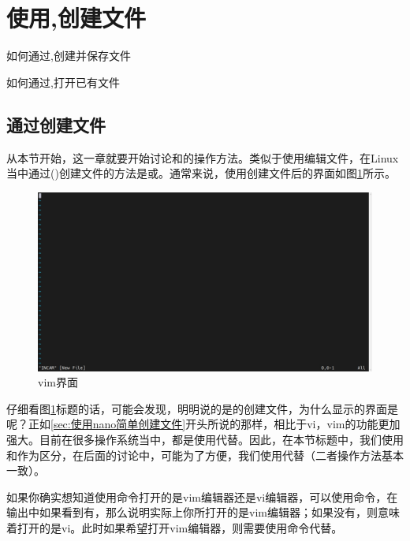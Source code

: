 \section{使用,创建文件}\label{sec:使用vi,vim创建文件}

\begin{Abstract}
    \item 如何通过,创建并保存文件
    \item 如何通过,打开已有文件
\end{Abstract}


\subsection{通过创建文件}\label{subsec:使用vi,vim创建文件-通过vi创建文件}

从本节开始，这一章就要开始讨论和的操作方法。类似于使用编辑文件，在Linux当中通过()创建文件的方法是或。通常来说，使用创建文件后的界面如图\ref{fig:使用vi,vim创建文件-vim界面}所示。

\begin{figure}
    \centering
    \includegraphics[width=1\linewidth]{Linux基础/文本编辑工具vi和vim/使用vi,vim创建文件/fig/vim界面.png}
    \caption{vim界面}
    \label{fig:使用vi,vim创建文件-vim界面}
\end{figure}

\begin{attention}
    仔细看图\ref{fig:使用vi,vim创建文件-vim界面}标题的话，可能会发现，明明说的是的创建文件，为什么显示的界面是呢？正如\ref{sec:使用nano简单创建文件}开头所说的那样，相比于vi，vim的功能更加强大。目前在很多操作系统当中，都是使用代替。因此，在本节标题中，我们使用和作为区分，在后面的讨论中，可能为了方便，我们使用代替（二者操作方法基本一致）。

    如果你确实想知道使用命令打开的是vim编辑器还是vi编辑器，可以使用命令，在输出中如果看到有，那么说明实际上你所打开的是vim编辑器；如果没有，则意味着打开的是vi。此时如果希望打开vim编辑器，则需要使用命令代替。
\end{attention}

